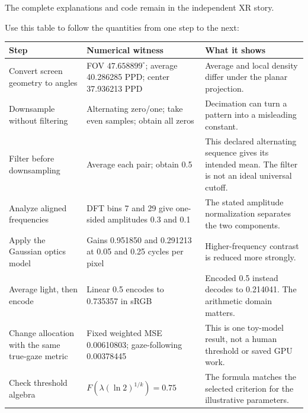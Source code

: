 The complete explanations and code remain in {the independent XR story}.

Use this table to follow the quantities from one step to the next:

{\def\LTcaptype{none} %
\begin{longtable}[]{@{}
  >{\raggedright\arraybackslash}p{}
  >{\raggedright\arraybackslash}p{}
  >{\raggedright\arraybackslash}p{}@{}}
\toprule\noalign{}
\begin{minipage}[b]{\linewidth}\raggedright
Step
\end{minipage} & \begin{minipage}[b]{\linewidth}\raggedright
Numerical witness
\end{minipage} & \begin{minipage}[b]{\linewidth}\raggedright
What it shows
\end{minipage} \\
\midrule\noalign{}
\endhead
\bottomrule\noalign{}
\endlastfoot
Convert screen geometry to angles & FOV \(47.658899^\circ\); average 40.286285 PPD; center 37.936213 PPD & Average and local density differ under the planar projection. \\
Downsample without filtering & Alternating zero/one; take even samples; obtain all zeros & Decimation can turn a pattern into a misleading constant. \\
Filter before downsampling & Average each pair; obtain 0.5 & This declared alternating sequence gives its intended mean. The filter is not an ideal universal cutoff. \\
Analyze aligned frequencies & DFT bins 7 and 29 give one-sided amplitudes 0.3 and 0.1 & The stated amplitude normalization separates the two components. \\
Apply the Gaussian optics model & Gains 0.951850 and 0.291213 at 0.05 and 0.25 cycles per pixel & Higher-frequency contrast is reduced more strongly. \\
Average light, then encode & Linear 0.5 encodes to 0.735357 in sRGB & Encoded 0.5 instead decodes to 0.214041. The arithmetic domain matters. \\
Change allocation with the same true-gaze metric & Fixed weighted MSE 0.00610803; gaze-following 0.00378445 & This is one toy-model result, not a human threshold or saved GPU work. \\
Check threshold algebra & \(F\!\left(\lambda(\ln2)^{1/k}\right)=0.75\) & The formula matches the selected criterion for the illustrative parameters. \\
\end{longtable}
}

